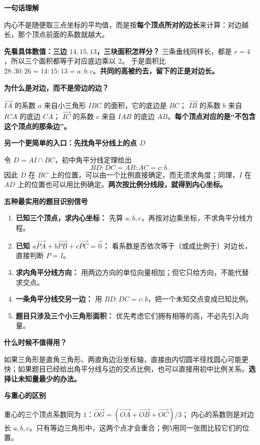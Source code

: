 \begin{explanationbox}
\textbf{一句话理解}

内心不是随便取三点坐标的平均值，而是按\textbf{每个顶点所对的边长}来计算：对边越长，那个顶点前面的系数就越大。

\medskip
\textbf{先看具体数值：三边 $14,15,13$，三块面积怎样分？}
三条垂线同样长，都是 $r=4$，所以三个面积都等于对应底边乘以 $2$。
于是面积比 $28:30:26=14:15:13=a:b:c$。\textbf{共同的高被约去，留下的正是对边长。}

\textbf{为什么是对边，而不是旁边的边？}

$\vec{IA}$ 的系数 $a$ 来自小三角形 $IBC$ 的面积，它的底边是 $BC$；
$\vec{IB}$ 的系数 $b$ 来自 $ICA$ 的底边 $CA$；
$\vec{IC}$ 的系数 $c$ 来自 $IAB$ 的底边 $AB$。\textbf{每个顶点对应的是“不包含这个顶点的那条边”。}

\medskip
\textbf{另一个更简单的入口：先找角平分线上的点 $D$}

令 $D=AI\cap BC$，初中角平分线定理给出
\[
BD:DC=AB:AC=c:b.
\]
因此 $D$ 在 $BC$ 上的位置，可以由一个比例直接确定，而无须求角度；同理，$I$ 在 $AD$ 上的位置也可以用比例确定。\textbf{两次按比例分线段，就得到内心坐标。}

\medskip
\textbf{五种最实用的题目识别信号}
\begin{enumerate}
\item \textbf{已知三个顶点，求内心坐标：} 先算 $a,b,c$，再按对边乘坐标，不求角平分线方程。
\item \textbf{已知 $a\vec{PA}+b\vec{PB}+c\vec{PC}=\vec0$：} 看系数是否依次等于（或成比例于）对边长，直接判断 $P=I$。
\item \textbf{求内角平分线方向：} 用两边方向的单位向量相加；但它只给方向，不能代替求交点。
\item \textbf{一条角平分线交另一边：} 用 $BD:DC=c:b$，把一个未知交点变成已知比例。
\item \textbf{题目只涉及三个小三角形面积：} 优先考虑它们拥有相等的高，不必先引入向量。
\end{enumerate}

\textbf{什么时候不值得用？}

如果三角形是直角三角形、两直角边沿坐标轴，直接由内切圆半径找圆心可能更快；如果题目已经给出角平分线与边的交点比例，也可以直接用初中比例关系。\textbf{选择让未知量最少的办法。}

\medskip
\textbf{与重心的区别}

重心的三个顶点系数同为 $1$：$\vec{OG}=(\vec{OA}+\vec{OB}+\vec{OC})/3$；
内心的系数则是对边长 $a,b,c$。只有等边三角形中，这两个点才会重合；例5用同一张图比较它们的位置。
\end{explanationbox}
